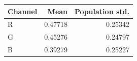 \begin{tabular}{lrr}
\hline
Channel & Mean & Population std. \\
\hline
R & 0.47718 & 0.25342 \\
G & 0.45276 & 0.24797 \\
B & 0.39279 & 0.25227 \\
\hline
\end{tabular}

